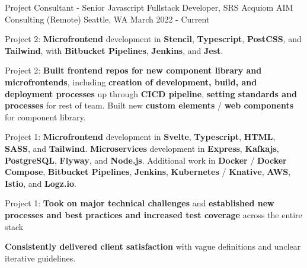 \begin{cventries}
\cventry
{Project Consultant - Senior Javascript Fullstack Developer, SRS Acquiom} %
{AIM Consulting (Remote)} %
{Seattle, WA} %
{March 2022 - Current} %
{
\begin{cvitems}
\item {Project 2: \textbf{Microfrontend} development in \textbf{Stencil}, \textbf{Typescript}, \textbf{PostCSS}, and \textbf{Tailwind}, with \textbf{Bitbucket Pipelines}, \textbf{Jenkins}, and \textbf{Jest}.}
\item {Project 2: \textbf{Built frontend repos for new component library and microfrontends}, including \textbf{creation of development, build, and deployment processes} up through \textbf{CICD pipeline}, \textbf{setting standards and processes} for rest of team. Built new \textbf{custom elements} / \textbf{web components} for component library.}
\item {Project 1: \textbf{Microfrontend} development in \textbf{Svelte}, \textbf{Typescript}, \textbf{HTML}, \textbf{SASS}, and \textbf{Tailwind}. \textbf{Microservices} development in \textbf{Express}, \textbf{Kafkajs}, \textbf{PostgreSQL}, \textbf{Flyway}, and \textbf{Node.js}. Additional work in \textbf{Docker} / \textbf{Docker Compose}, \textbf{Bitbucket Pipelines}, \textbf{Jenkins}, \textbf{Kubernetes} / \textbf{Knative}, \textbf{AWS}, \textbf{Istio}, and \textbf{Logz.io}.}
\item {Project 1: \textbf{Took on major technical challenges} and \textbf{established new processes and best practices and increased test coverage} across the entire stack}
\item {\textbf{Consistently delivered client satisfaction} with vague definitions and unclear iterative guidelines.}
\end{cvitems}
}


\end{cventries}
